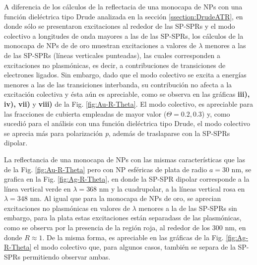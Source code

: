 A diferencia de los cálculos de la reflectacia de una monocapa de NPs  con una función dieléctrica tipo Drude analizada en la sección \ref{ssection:DrudeATR}, en donde sólo se presentaron excitaciones al rededor de las SP-SPRs y el modo colectivo a longitudes de onda mayores a las de las SP-SPRs, los cálculos de la monocapa de NPs de de oro muestran excitaciones a valores de $\lambda$ menores a las de las SP-SPRs (líneas verticales punteadas), las cuales corresponden a excitaciones no plasmónicas, es decir, a contribuciones de transiciones de electrones ligados. Sin embargo, dado que el modo colectivo se excita a energías menores a las de las transiciones interbanda, su contribución no afecta a la excitación colectiva y ésta aún es apreciable, como se observa en las gráficas \textbf{iii), iv), vii)} y \textbf{viii)} de la Fig. \ref{fig:Au-R-Theta}. El modo colectivo, es apreciable para las fracciones de cubierta empleadas de mayor valor ($\Theta = 0.2, 0.3$) y, como sucedió para el análisis con una función dieléctrica tipo Drude, el modo colectivo se aprecia más para polarización \emph{p}, además de traslaparse con la SP-SPRs dipolar.

La reflectancia de una monocapa de NPs con las mismas características que las de la Fig. \ref{fig:Au-R-Theta} pero con NP esféricas de plata de radio $a=30$ nm, se grafica en la Fig. \ref{fig:Ag-R-Theta}, en donde la SP-SPR dipolar corresponde a la línea vertical verde en $\lambda=368$ nm y la cuadrupolar, a la líneas vertical rosa en $\lambda=348$ nm. Al igual que para la monocapa de NPs de oro, se aprecian excitaciones no plasmónicas en valores de $\lambda$ menores a la de las SP-SPRs sin embargo, para la plata estas excitaciones están separadass de las plasmónicas, como se observa por la presencia de la región roja, al rededor de los $300$ nm,  en donde $R\approx 1$. De la misma forma, es apreciable en las gráficas de la Fig. \ref{fig:Ag-R-Theta} el modo colectivo que, para algunos casos, también se separa de la SP-SPRs permitiendo observar ambas.

